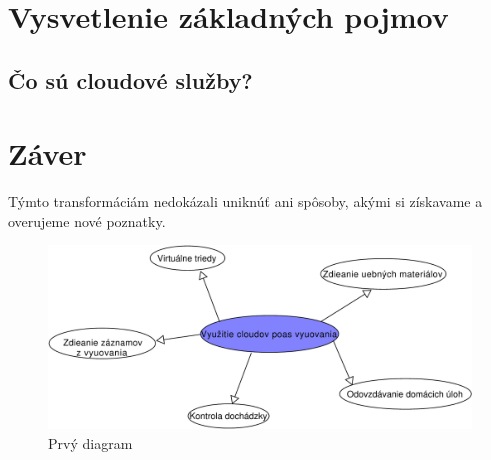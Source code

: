 \documentclass[10pt,slovak,a4paper]{article}%
\begin{document}
\section{Vysvetlenie základných pojmov}

\subsection{Čo sú cloudové služby?}

\section{Záver}


Týmto transformáciám nedokázali uniknúť ani spôsoby, akými si získavame a overujeme nové poznatky.

\begin{figure}
\includegraphics[width=1\textwidth]{Obrázky/opis-crop.pdf}
\caption{Prvý diagram}
\end{figure}



\end{document}
